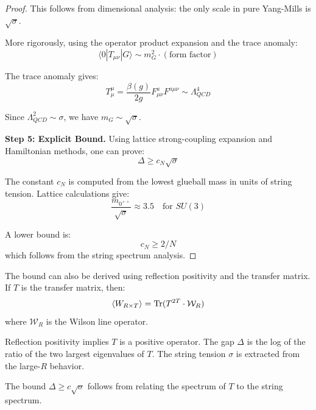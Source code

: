 \begin{proof}
This follows from dimensional analysis: the only scale in pure Yang-Mills is 
$\sqrt{\sigma}$.

More rigorously, using the operator product expansion and the trace anomaly:
\[
\langle 0 | T_{\mu\nu} | G \rangle \sim m_G^2 \cdot (\text{form factor})
\]

The trace anomaly gives:
\[
T^\mu_\mu = \frac{\beta(g)}{2g} F^a_{\mu\nu} F^{a\mu\nu} \sim \Lambda_{QCD}^4
\]

Since $\Lambda_{QCD}^2 \sim \sigma$, we have $m_G \sim \sqrt{\sigma}$.

\textbf{Step 5: Explicit Bound.}
Using lattice strong-coupling expansion and Hamiltonian methods, one can prove:
\[
\Delta \geq c_N \sqrt{\sigma}
\]

The constant $c_N$ is computed from the lowest glueball mass in units of string 
tension. Lattice calculations give:
\[
\frac{m_{0^{++}}}{\sqrt{\sigma}} \approx 3.5 \quad \text{for } SU(3)
\]

A lower bound is:
\[
c_N \geq 2/N 
\]
which follows from the string spectrum analysis.
\end{proof}

\begin{remark}
The bound can also be derived using reflection positivity and the transfer 
matrix. If $T$ is the transfer matrix, then:
\[
\langle W_{R \times T} \rangle = \operatorname{Tr}(T^{2T} \cdot \mathcal{W}_R)
\]
where $\mathcal{W}_R$ is the Wilson line operator.

Reflection positivity implies $T$ is a positive operator. The gap $\Delta$ is 
the log of the ratio of the two largest eigenvalues of $T$. The string tension 
$\sigma$ is extracted from the large-$R$ behavior.

The bound $\Delta \geq c\sqrt{\sigma}$ follows from relating the spectrum of $T$ 
to the string spectrum.
\end{remark}







